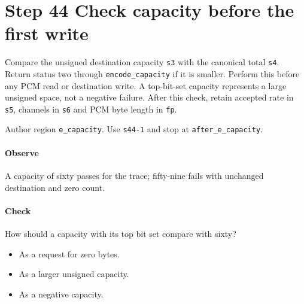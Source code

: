 \section{Step 44 Check capacity before the first write}\label{pcm-wav-s44}
Compare the unsigned destination capacity \texttt{s3} with the canonical total \texttt{s4}. Return status two through \texttt{encode\_capacity} if it is smaller. Perform this before any PCM read or destination write. A top-bit-set capacity represents a large unsigned space, not a negative failure. After this check, retain accepted rate in \texttt{s5}, channels in \texttt{s6} and PCM byte length in \texttt{fp}.

Author region \texttt{e\_capacity}. Use \texttt{s44-1} and stop at \texttt{after\_e\_capacity}.

\paragraph{Observe} A capacity of sixty passes for the trace; fifty-nine fails with unchanged destination and zero count.

\paragraph{Check} How should a capacity with its top bit set compare with sixty?
\begin{itemize}
  \item[A.] As a request for zero bytes.
  \item[B.] As a larger unsigned capacity.
  \item[C.] As a negative capacity.
\end{itemize}
